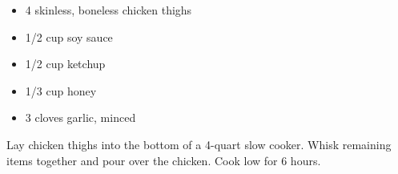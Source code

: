 
\ingredients
\begin{itemize}
        \item 4 skinless, boneless chicken thighs
        \item 1/2 cup soy sauce
        \item 1/2 cup ketchup
        \item 1/3 cup honey
        \item 3 cloves garlic, minced
\end{itemize}

\instructions
Lay chicken thighs into the bottom of a 4-quart slow cooker.
Whisk remaining items together and pour over the chicken. Cook low for 6
hours.
